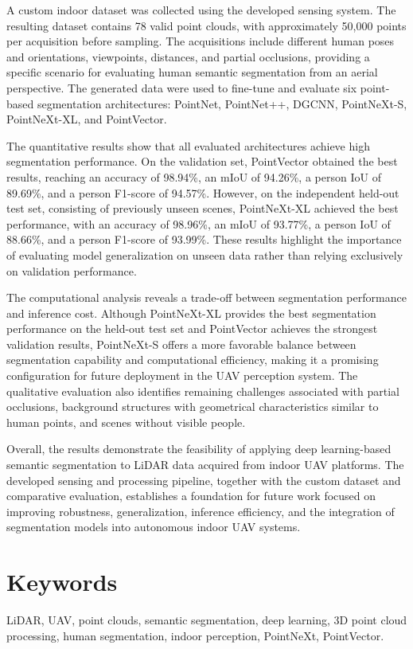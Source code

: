 A custom indoor dataset was collected using the developed sensing system. The resulting dataset contains 78 valid point clouds, with approximately 50,000 points per acquisition before sampling. The acquisitions include different human poses and orientations, viewpoints, distances, and partial occlusions, providing a specific scenario for evaluating human semantic segmentation from an aerial perspective. The generated data were used to fine-tune and evaluate six point-based segmentation architectures: PointNet, PointNet++, DGCNN, PointNeXt-S, PointNeXt-XL, and PointVector.

The quantitative results show that all evaluated architectures achieve high segmentation performance. On the validation set, PointVector obtained the best results, reaching an accuracy of 98.94\%, an mIoU of 94.26\%, a person IoU of 89.69\%, and a person F1-score of 94.57\%. However, on the independent held-out test set, consisting of previously unseen scenes, PointNeXt-XL achieved the best performance, with an accuracy of 98.96\%, an mIoU of 93.77\%, a person IoU of 88.66\%, and a person F1-score of 93.99\%. These results highlight the importance of evaluating model generalization on unseen data rather than relying exclusively on validation performance.

The computational analysis reveals a trade-off between segmentation performance and inference cost. Although PointNeXt-XL provides the best segmentation performance on the held-out test set and PointVector achieves the strongest validation results, PointNeXt-S offers a more favorable balance between segmentation capability and computational efficiency, making it a promising configuration for future deployment in the UAV perception system. The qualitative evaluation also identifies remaining challenges associated with partial occlusions, background structures with geometrical characteristics similar to human points, and scenes without visible people.

Overall, the results demonstrate the feasibility of applying deep learning-based semantic segmentation to LiDAR data acquired from indoor UAV platforms. The developed sensing and processing pipeline, together with the custom dataset and comparative evaluation, establishes a foundation for future work focused on improving robustness, generalization, inference efficiency, and the integration of segmentation models into autonomous indoor UAV systems.

\vfill
\section*{Keywords}
LiDAR, UAV, point clouds, semantic segmentation, deep learning, 3D point cloud processing, human segmentation, indoor perception, PointNeXt, PointVector.

